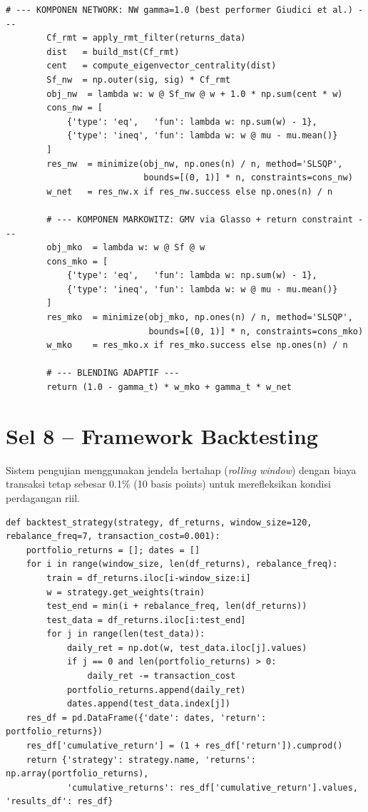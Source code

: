 \documentclass[12pt,a4paper]{article}
\begin{document}
\begin{lstlisting}[caption={Kelas-kelas strategi portofolio (AGGP v3 -- Fix A/B/C Applied)}]
        # --- KOMPONEN NETWORK: NW gamma=1.0 (best performer Giudici et al.) ---
        Cf_rmt = apply_rmt_filter(returns_data)
        dist   = build_mst(Cf_rmt)
        cent   = compute_eigenvector_centrality(dist)
        Sf_nw  = np.outer(sig, sig) * Cf_rmt
        obj_nw  = lambda w: w @ Sf_nw @ w + 1.0 * np.sum(cent * w)
        cons_nw = [
            {'type': 'eq',   'fun': lambda w: np.sum(w) - 1},
            {'type': 'ineq', 'fun': lambda w: w @ mu - mu.mean()}
        ]
        res_nw  = minimize(obj_nw, np.ones(n) / n, method='SLSQP',
                           bounds=[(0, 1)] * n, constraints=cons_nw)
        w_net   = res_nw.x if res_nw.success else np.ones(n) / n

        # --- KOMPONEN MARKOWITZ: GMV via Glasso + return constraint ---
        obj_mko  = lambda w: w @ Sf @ w
        cons_mko = [
            {'type': 'eq',   'fun': lambda w: np.sum(w) - 1},
            {'type': 'ineq', 'fun': lambda w: w @ mu - mu.mean()}
        ]
        res_mko  = minimize(obj_mko, np.ones(n) / n, method='SLSQP',
                            bounds=[(0, 1)] * n, constraints=cons_mko)
        w_mko    = res_mko.x if res_mko.success else np.ones(n) / n

        # --- BLENDING ADAPTIF ---
        return (1.0 - gamma_t) * w_mko + gamma_t * w_net
\end{lstlisting}

\section{Sel 8 -- Framework Backtesting}
Sistem pengujian menggunakan jendela bertahap (\textit{rolling window}) dengan biaya transaksi tetap sebesar 0.1\% (10 basis points) untuk merefleksikan kondisi perdagangan riil.

\begin{lstlisting}[caption={Fungsi simulasi backtest}]
def backtest_strategy(strategy, df_returns, window_size=120, rebalance_freq=7, transaction_cost=0.001):
    portfolio_returns = []; dates = []
    for i in range(window_size, len(df_returns), rebalance_freq):
        train = df_returns.iloc[i-window_size:i]
        w = strategy.get_weights(train)
        test_end = min(i + rebalance_freq, len(df_returns))
        test_data = df_returns.iloc[i:test_end]
        for j in range(len(test_data)):
            daily_ret = np.dot(w, test_data.iloc[j].values)
            if j == 0 and len(portfolio_returns) > 0:
                daily_ret -= transaction_cost
            portfolio_returns.append(daily_ret)
            dates.append(test_data.index[j])
    res_df = pd.DataFrame({'date': dates, 'return': portfolio_returns})
    res_df['cumulative_return'] = (1 + res_df['return']).cumprod()
    return {'strategy': strategy.name, 'returns': np.array(portfolio_returns),
            'cumulative_returns': res_df['cumulative_return'].values, 'results_df': res_df}
\end{lstlisting}
\end{document}
